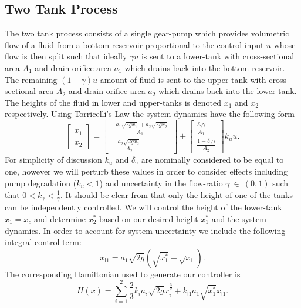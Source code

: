 \subsection{Two Tank Process}
\label{S:two_tank}
The two tank process consists of a single gear-pump which provides
volumetric flow of a fluid from a bottom-reservoir proportional to the control
input $u$ whose flow is then split such that ideally $\gamma u$ is sent to a
lower-tank with cross-sectional area $A_1$ and drain-orifice area
$a_1$ which drains back into the bottom-reservoir.  The remaining
$(1-\gamma)u$ amount of fluid is sent to the upper-tank with
cross-sectional area $A_2$ and drain-orifice area $a_2$ which drains
back into the lower-tank.  The heights of the fluid in lower and
upper-tanks is denoted $x_1$ and $x_2$ respectively.  Using
Torricelli's Law the system dynamics have the following form
\begin{equation}
\label{E:two_tank}
\begin{bmatrix}
\dot{x}_1\\
\dot{x}_2
\end{bmatrix}=
\begin{bmatrix}
\frac{-a_1 \sqrt{2gx_1} + a_2 \sqrt{2gx_2}}{A_1} \\
-\frac{a_2 \sqrt{2gx_2}}{A_2} 
\end{bmatrix}+
\begin{bmatrix}
\frac{\delta_{\gamma} \gamma}{A_1}\\
\frac{1 - \delta_{\gamma} \gamma}{A_2}
\end{bmatrix} k_u u.
\end{equation}
For simplicity of discussion $k_u$ and $\delta_{\gamma}$ are nominally
considered to be equal to one, however we will perturb these values in
order to consider effects including pump degradation ($k_u < 1$) and
uncertainty in the flow-ratio $\gamma\ \in\ (0,1)$ such that $0 <
k_{\gamma} < \frac{1}{\gamma}$.  It should be clear from
 that only the height of one of the tanks can be
independently controlled.  We will control the height of the
lower-tank $x_1=x_c$ and determine $x_2^*$ based on our desired height
$x_1^*$ and the system dynamics. In order to account for system
uncertainty we include the following integral control term:
\begin{equation}
\label{E:two_tank_I}
\dot{x}_{\mathsf{I}1} = a_1 \sqrt{2 g} \left ( \sqrt{x^*_1} -
  \sqrt{x_1} \right ).
\end{equation}
The corresponding Hamiltonian used to generate our controller is 
\begin{equation}
\label{E:two_tank_ham}
H(x) = \sum_{i=1}^2 \frac{2}{3} k_i a_i \sqrt{2g} x_i^{\frac{3}{2}} +
k_{\mathsf{I}1} a_1 \sqrt{x_1^*} x_{\mathsf{I}1}.
\end{equation}
